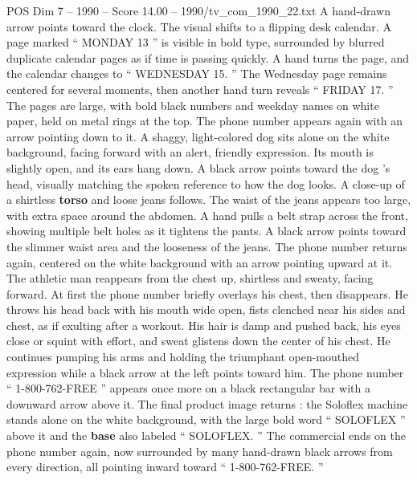 \begin{textsample}{POS Dim 7 – 1990 – Score 14.00 – 1990/tv\_com\_1990\_22.txt}
A hand-drawn arrow points toward the clock.
The visual shifts to a flipping desk calendar.
A page marked “ MONDAY 13 ” is visible in bold type, surrounded by blurred duplicate calendar pages as if time is passing quickly.
A hand turns the page, and the calendar changes to “ WEDNESDAY 15. ” The Wednesday page remains centered for several moments, then another hand turn reveals “ FRIDAY 17. ” The pages are large, with bold black numbers and weekday names on white paper, held on metal rings at the top.
The phone number appears again with an arrow pointing down to it.
A shaggy, light-colored dog sits alone on the white background, facing forward with an alert, friendly expression.
Its mouth is slightly open, and its ears hang down.
A black arrow points toward the dog ’s head, visually matching the spoken reference to how the dog looks.
A close-up of a shirtless \textbf{torso} and loose jeans follows.
The waist of the jeans appears too large, with extra space around the abdomen.
A hand pulls a belt strap across the front, showing multiple belt holes as it tightens the pants.
A black arrow points toward the slimmer waist area and the looseness of the jeans.
The phone number returns again, centered on the white background with an arrow pointing upward at it.
The athletic man reappears from the chest up, shirtless and sweaty, facing forward.
At first the phone number briefly overlays his chest, then disappears.
He throws his head back with his mouth wide open, fists clenched near his sides and chest, as if exulting after a workout.
His hair is damp and pushed back, his eyes close or squint with effort, and sweat glistens down the center of his chest.
He continues pumping his arms and holding the triumphant open-mouthed expression while a black arrow at the left points toward him.
The phone number “ 1-800-762-FREE ” appears once more on a black rectangular bar with a downward arrow above it.
The final product image returns : the Soloflex machine stands alone on the white background, with the large bold word “ SOLOFLEX ” above it and the \textbf{base} also labeled “ SOLOFLEX. ” The commercial ends on the phone number again, now surrounded by many hand-drawn black arrows from every direction, all pointing inward toward “ 1-800-762-FREE. ”

\end{textsample}
